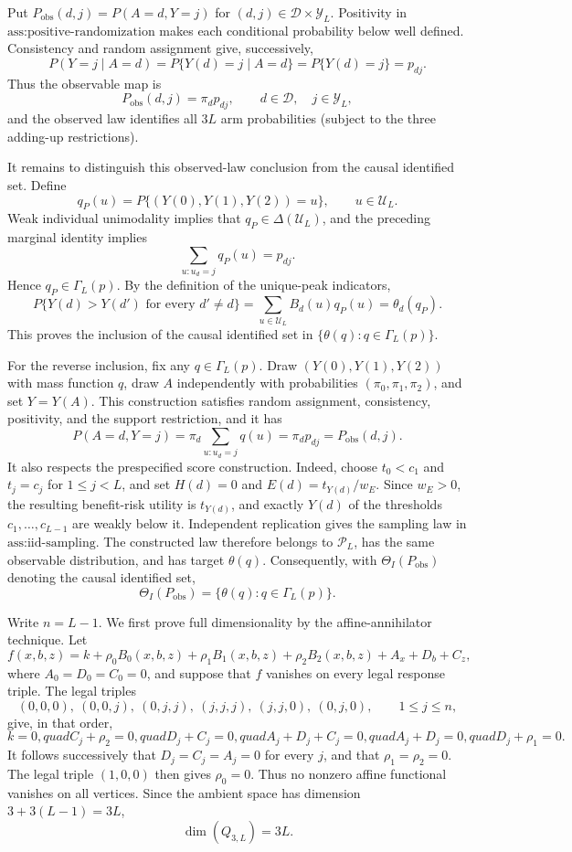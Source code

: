 Put \(P_{\mathrm{obs}}(d,j)=P(A=d,Y=j)\) for \((d,j)\in\mathcal D\times\mathcal Y_L\).  Positivity in \(\text{ass:positive-randomization}\) makes each conditional probability below well defined.  Consistency and random assignment give, successively,
\[
 P(Y=j\mid A=d)
 =P\{Y(d)=j\mid A=d\}
 =P\{Y(d)=j\}
 =p_{dj}.
\]
Thus the observable map is
\[
 P_{\mathrm{obs}}(d,j)=\pi_d p_{dj},
 \qquad d\in\mathcal D,\quad j\in\mathcal Y_L,
\]
and the observed law identifies all \(3L\) arm probabilities (subject to the three adding-up restrictions).

It remains to distinguish this observed-law conclusion from the causal identified set.  Define
\[
 q_P(u)=P\{(Y(0),Y(1),Y(2))=u\},\qquad u\in\mathcal U_L.
\]
Weak individual unimodality implies that \(q_P\in\Delta(\mathcal U_L)\), and the preceding marginal identity implies
\[
 \sum_{u:u_d=j}q_P(u)=p_{dj}.
\]
Hence \(q_P\in\Gamma_L(p)\).  By the definition of the unique-peak indicators,
\[
 P\{Y(d)>Y(d')\text{ for every }d'\ne d\}
 =\sum_{u\in\mathcal U_L}B_d(u)q_P(u)=\theta_d(q_P).
\]
This proves the inclusion of the causal identified set in \(\{\theta(q):q\in\Gamma_L(p)\}\).

For the reverse inclusion, fix any \(q\in\Gamma_L(p)\).  Draw \((Y(0),Y(1),Y(2))\) with mass function \(q\), draw \(A\) independently with probabilities \((\pi_0,\pi_1,\pi_2)\), and set \(Y=Y(A)\).  This construction satisfies random assignment, consistency, positivity, and the support restriction, and it has
\[
 P(A=d,Y=j)=\pi_d\sum_{u:u_d=j}q(u)=\pi_dp_{dj}=P_{\mathrm{obs}}(d,j).
\]
It also respects the prespecified score construction.  Indeed, choose \(t_0<c_1\) and \(t_j=c_j\) for \(1\le j<L\), and set \(H(d)=0\) and \(E(d)=t_{Y(d)}/w_E\).  Since \(w_E>0\), the resulting benefit-risk utility is \(t_{Y(d)}\), and exactly \(Y(d)\) of the thresholds \(c_1,\ldots,c_{L-1}\) are weakly below it.  Independent replication gives the sampling law in \(\text{ass:iid-sampling}\).  The constructed law therefore belongs to \(\mathcal P_L\), has the same observable distribution, and has target \(\theta(q)\).  Consequently, with \(\Theta_I(P_{\mathrm{obs}})\) denoting the causal identified set,
\[
 \Theta_I(P_{\mathrm{obs}})=\{\theta(q):q\in\Gamma_L(p)\}.
\]

Write \(n=L-1\).  We first prove full dimensionality by the affine-annihilator technique.  Let
\[
 f(x,b,z)=k+\rho_0B_0(x,b,z)+\rho_1B_1(x,b,z)+\rho_2B_2(x,b,z)
             +A_x+D_b+C_z,
\]
where \(A_0=D_0=C_0=0\), and suppose that \(f\) vanishes on every legal response triple.  The legal triples
\[
 (0,0,0),\ (0,0,j),\ (0,j,j),\ (j,j,j),\ (j,j,0),\ (0,j,0),
 \qquad 1\le j\le n,
\]
give, in that order,
\[
 k=0,quad C_j+\rho_2=0,quad D_j+C_j=0,quad
 A_j+D_j+C_j=0,quad A_j+D_j=0,quad D_j+\rho_1=0.
\]
It follows successively that \(D_j=C_j=A_j=0\) for every \(j\), and that \(\rho_1=\rho_2=0\).  The legal triple \((1,0,0)\) then gives \(\rho_0=0\).  Thus no nonzero affine functional vanishes on all vertices.  Since the ambient space has dimension \(3+3(L-1)=3L\),
\[
 \dim(Q_{3,L})=3L.
\]

